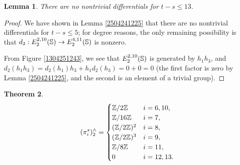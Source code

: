 \documentclass[11pt, titlepage]{article} %
\def\bb{\ensuremath\mathbb}
\def\inte{\ensuremath\mathbb{Z}}
\numberwithin{equation}{subsection}
\theoremstyle{plain}
\newtheorem{theorem}{Theorem}[subsection]
\newtheorem{lemma}[theorem]{Lemma}
\theoremstyle{definition}
\begin{document}
\begin{lemma}
There are no nontrivial differentials for \(t-s\leq 13\). 
\end{lemma}

\begin{proof}
We have shown in Lemma \ref{2504241225} that there are no nontrivial differentials for \(t-s\leq 5\); for degree reasons, the only remaining possibility is that \(d_2 : E_2^{2, 10}(\bb{S}) \to E_2^{4, 11}(\bb{S})\) is nonzero.

From Figure \ref{1304251243}, we see that \(E^{2, 10}_2(\bb{S})\) is generated by \(h_1h_3\), and \(d_2(h_1h_3)=d_2(h_1)h_3+h_1d_2(h_3)=0+0=0\) (the first factor is zero by Lemma \ref{2504241225}, and the second is an element of a trivial group). 
\end{proof}

\begin{theorem}
\[(\pi_i^s)^\wedge_2=\begin{cases}
\inte/2\inte & i = 6, 10,\\
\inte/16\inte & i = 7,\\
(\inte/2\inte)^2 & i = 8,\\
(\inte/2\inte)^3 & i = 9,\\
\inte/8\inte & i = 11,\\
0 & i = 12, 13.
\end{cases}\]
\end{theorem}
\end{document}
